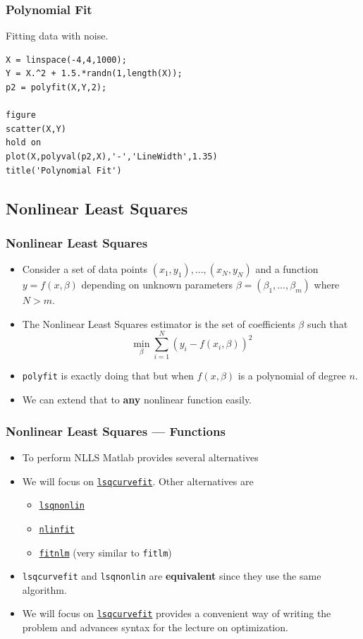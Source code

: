 \documentclass[11pt,xcolor={svgnames},aspectratio=169,usepdftitle=false,notheorems]{beamer}
\begin{document}
\begin{frame}[fragile]
  \frametitle{Polynomial Fit}
Fitting data with noise.
\begin{lstlisting}
X = linspace(-4,4,1000);
Y = X.^2 + 1.5.*randn(1,length(X));
p2 = polyfit(X,Y,2);

figure
scatter(X,Y)
hold on
plot(X,polyval(p2,X),'-','LineWidth',1.35)
title('Polynomial Fit')
\end{lstlisting}
\end{frame}

\subsection{Nonlinear Least Squares}

\begin{frame}[fragile]
  \frametitle{Nonlinear Least Squares}
\begin{itemize}
  \item Consider a set of data points $(x_1,y_1),\ldots,(x_N,y_N)$ and a function $y = f(x,\beta)$ depending on unknown parameters $\beta = (\beta_1,\ldots,\beta_m)$ where $N > m$.
  \item The Nonlinear Least Squares estimator is the set of coefficients $\beta$ such that
  \[
  \underset{\beta}{\min} \sum^N_{i=1} (y_i - f(x_i,\beta))^2
  \]
  \item \verb;polyfit; is exactly doing that but when $f(x,\beta)$ is a polynomial of degree $n$.
  \item We can extend that to \alert{\textbf{any}} nonlinear function easily.
\end{itemize}
\end{frame}

\begin{frame}[fragile]
  \frametitle{Nonlinear Least Squares --- Functions}
\begin{itemize}
  \item To perform NLLS Matlab provides several alternatives
  \item We will focus on \href{https://www.mathworks.com/help/optim/ug/lsqcurvefit.html}{\texttt{lsqcurvefit}}. Other alternatives are
  \begin{itemize}
    \item \href{https://www.mathworks.com/help/optim/ug/lsqnonlin.html}{\texttt{lsqnonlin}}
    \item \href{https://www.mathworks.com/help/stats/nlinfit.html}{\texttt{nlinfit}}
    \item \href{https://www.mathworks.com/help/stats/fitnlm.html}{\texttt{fitnlm}} (very similar to \texttt{fitlm})
  \end{itemize}
  \item \texttt{lsqcurvefit} and \texttt{lsqnonlin} are \alert{\textbf{equivalent}} since they use the same algorithm.
  \item We will focus on \href{https://www.mathworks.com/help/optim/ug/lsqcurvefit.html}{\texttt{lsqcurvefit}} provides a convenient way of writing the problem and advances syntax for the lecture on optimization.
\end{itemize}
\end{frame}
\end{document}
